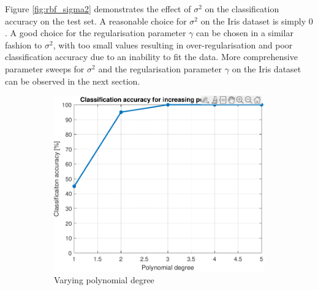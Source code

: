 \documentclass{article}
\begin{document}
           Figure \ref{fig:rbf_sigma2} demonstrates the effect of $\sigma^2$ on the classification accuracy on the test set. A reasonable choice for $\sigma^2$ on the Iris dataset is simply $0$. A good choice for the regularisation parameter $\gamma$ can be chosen in  a similar fashion to $\sigma^2$, with too small values resulting in over-regularisation and poor classification accuracy due to an inability to fit the data. More comprehensive parameter sweeps for $\sigma^2$ and the regularisation parameter $\gamma$ on the Iris dataset can be observed in the next section. 
            \begin{figure}[h]
                 \centering
                 \hspace{0.05\textwidth}
                 \begin{subfigure}[b]{0.4\textwidth}
                     \centering
                     \includegraphics[width=\textwidth]{Assignment 1/figures/class_acc_poly_deg_val.pdf}
                    \caption{Varying polynomial degree}
                     \label{fig:polynomial_degree}
                 \end{subfigure}
                 \hfill
                 \begin{subfigure}[b]{0.4\textwidth}
                     \centering

\end{subfigure}
\end{figure}
\end{document}
